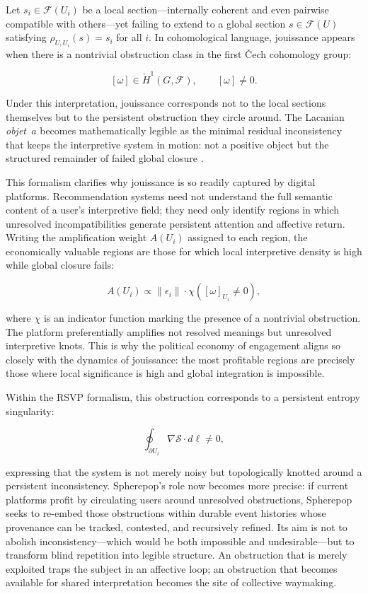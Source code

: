 \documentclass[12pt,a4paper]{article}
\begin{document}
Let $s_i \in \mathcal{F}(U_i)$ be a local section---internally coherent and even pairwise
compatible with others---yet failing to extend to a global section $s \in \mathcal{F}(U)$
satisfying $\rho_{U,U_i}(s) = s_i$ for all $i$. In cohomological language, jouissance appears
when there is a nontrivial obstruction class in the first \v{C}ech cohomology group:

\[
[\omega] \in \check{H}^{1}(G,\mathcal{F}), \qquad [\omega] \neq 0.
\]

Under this interpretation, jouissance corresponds not to the local sections themselves but to
the persistent obstruction they circle around. The Lacanian \emph{objet~$a$} becomes
mathematically legible as the minimal residual inconsistency that keeps the interpretive
system in motion: not a positive object but the structured remainder of failed global closure
\citep{dallaglio2024,lacan2006}.

This formalism clarifies why jouissance is so readily captured by digital platforms.
Recommendation systems need not understand the full semantic content of a user's interpretive
field; they need only identify regions in which unresolved incompatibilities generate
persistent attention and affective return. Writing the amplification weight $A(U_i)$ assigned
to each region, the economically valuable regions are those for which local interpretive
density is high while global closure fails:

\[
A(U_i) \propto \|\epsilon_i\| \cdot \chi\!\left([\omega]_{U_i} \neq 0\right),
\]

where $\chi$ is an indicator function marking the presence of a nontrivial obstruction. The
platform preferentially amplifies not resolved meanings but unresolved interpretive knots.
This is why the political economy of engagement aligns so closely with the dynamics of
jouissance: the most profitable regions are precisely those where local significance is high
and global integration is impossible.

Within the RSVP formalism, this obstruction corresponds to a persistent entropy singularity:

\[
\oint_{\partial U_i} \nabla\mathcal{S} \cdot d\ell \neq 0,
\]

expressing that the system is not merely noisy but topologically knotted around a persistent
inconsistency. Spherepop's role now becomes more precise: if current platforms profit by
circulating users around unresolved obstructions, Spherepop seeks to re-embed those
obstructions within durable event histories whose provenance can be tracked, contested, and
recursively refined. Its aim is not to abolish inconsistency---which would be both impossible
and undesirable---but to transform blind repetition into legible structure. An obstruction
that is merely exploited traps the subject in an affective loop; an obstruction that becomes
available for shared interpretation becomes the site of collective waymaking.
\end{document}
